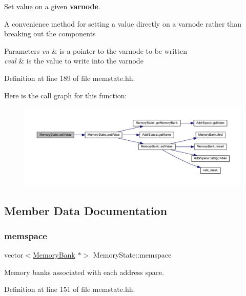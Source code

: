 Set value on a given {\bfseries{varnode}}. 

A convenience method for setting a value directly on a varnode rather than breaking out the components 
\begin{DoxyParams}{Parameters}
{\em vn} & is a pointer to the varnode to be written \\
\hline
{\em cval} & is the value to write into the varnode \\
\hline
\end{DoxyParams}


Definition at line 189 of file memstate.\+hh.

Here is the call graph for this function\+:
\nopagebreak
\begin{figure}[H]
\begin{center}
\leavevmode
\includegraphics[width=350pt]{class_memory_state_a9ec71816b195b33524214f82651a99cd_cgraph}
\end{center}
\end{figure}


\subsection{Member Data Documentation}
\mbox{\label{class_memory_state_a2731beff27c773def592922b2f71d76d}} 
\subsubsection{\texorpdfstring{memspace}{memspace}}
{\footnotesize\ttfamily vector$<$\mbox{\hyperlink{class_memory_bank}{Memory\+Bank}} $\ast$$>$ Memory\+State\+::memspace\hspace{0.3cm}{\ttfamily [protected]}}



Memory banks associated with each address space. 



Definition at line 151 of file memstate.\+hh.

